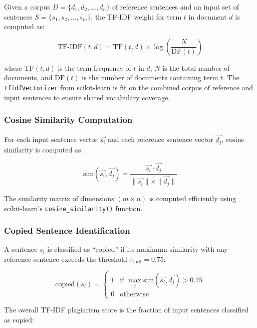 \documentclass[conference]{IEEEtran}
\begin{document}
Given a corpus $D = \{d_1, d_2, \ldots, d_n\}$ of reference sentences and an input set of sentences $S = \{s_1, s_2, \ldots, s_m\}$, the TF-IDF weight for term $t$ in document $d$ is computed as:

\begin{equation}
\text{TF-IDF}(t, d) = \text{TF}(t, d) \times \log\left(\frac{N}{\text{DF}(t)}\right)
\label{eq_tfidf}
\end{equation}

\noindent where $\text{TF}(t, d)$ is the term frequency of $t$ in $d$, $N$ is the total number of documents, and $\text{DF}(t)$ is the number of documents containing term $t$. The \texttt{TfidfVectorizer} from scikit-learn is fit on the combined corpus of reference and input sentences to ensure shared vocabulary coverage.

\subsubsection{Cosine Similarity Computation}

For each input sentence vector $\vec{s_i}$ and each reference sentence vector $\vec{d_j}$, cosine similarity is computed as:

\begin{equation}
\text{sim}(\vec{s_i}, \vec{d_j}) = \frac{\vec{s_i} \cdot \vec{d_j}}{\|\vec{s_i}\| \times \|\vec{d_j}\|}
\label{eq_cosine}
\end{equation}

\noindent The similarity matrix of dimensions $(m \times n)$ is computed efficiently using scikit-learn's \texttt{cosine\_similarity()} function.

\subsubsection{Copied Sentence Identification}

A sentence $s_i$ is classified as ``copied'' if its maximum similarity with any reference sentence exceeds the threshold $\tau_{\text{tfidf}} = 0.75$:

\begin{equation}
\text{copied}(s_i) = \begin{cases} 1 & \text{if } \max_j \text{sim}(\vec{s_i}, \vec{d_j}) > 0.75 \\ 0 & \text{otherwise} \end{cases}
\label{eq_copied}
\end{equation}

\noindent The overall TF-IDF plagiarism score is the fraction of input sentences classified as copied:
\end{document}
